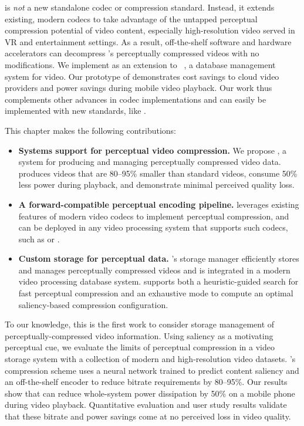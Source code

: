 \name is \textit{not} a new standalone codec or compression standard.
Instead, it extends existing, modern codecs to take advantage of the untapped perceptual compression potential of video content, especially high-resolution video served in VR and entertainment settings.
As a result, off-the-shelf software and hardware accelerators can decompress \name's perceptually compressed videos with no modifications.
We implement \name as an extension to \lightdb~\cite{lightdb}, a database management system for video.
Our prototype of \name demonstrates cost savings to cloud video providers and power savings during mobile video playback.
Our work thus complements other advances in codec implementations and can easily be implemented with new standards, like \avone.

This chapter makes the following contributions:

\begin{itemize}
  \item \textbf{Systems support for perceptual video compression.} We propose \name, a system for producing and managing perceptually compressed video data. \name produces videos that are 80--95\% smaller than standard videos, consume 50\% less power during playback, and demonstrate minimal perceived quality loss.
  \item \textbf{A forward-compatible perceptual encoding pipeline.} \name leverages existing features of modern video codecs to implement perceptual compression, and can be deployed in any video processing system that supports such codecs, such as \hevc or \avone. %
  \item \textbf{Custom storage for perceptual data.} \name's storage manager efficiently stores and manages perceptually compressed videos and is integrated in a modern video processing database system. \nameStore supports both a heuristic-guided search for fast perceptual compression and an exhaustive mode to compute an optimal saliency-based compression configuration.
\end{itemize}

\noindent To our knowledge, this is the first work to consider storage management of perceptually-compressed video information.
Using saliency as a motivating perceptual cue, we evaluate the limits of perceptual compression in a video storage system with a collection of modern and high-resolution video datasets.
\name's compression scheme uses a neural network trained to predict content saliency and an off-the-shelf \hevc encoder to reduce bitrate requirements by 80--95\%.
Our results show that \name can reduce whole-system power dissipation by 50\% on a mobile phone during video playback.
Quantitative evaluation and user study results validate that these bitrate and power savings come at no perceived loss in video quality.
